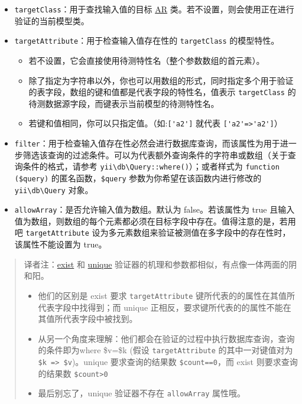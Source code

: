 \begin{itemize}
\item \lstinline|targetClass|：用于查找输入值的目标 \hyperref[db-active-record.md]{AR} 类。若不设置，则会使用正在进行验证的当前模型类。
\item \lstinline|targetAttribute|：用于检查输入值存在性的 \lstinline|targetClass| 的模型特性。\begin{itemize}
\item 若不设置，它会直接使用待测特性名（整个参数数组的首元素）。
\item 除了指定为字符串以外，你也可以用数组的形式，同时指定多个用于验证的表字段，数组的键和值都是代表字段的特性名，值表示 \lstinline|targetClass| 的待测数据源字段，而键表示当前模型的待测特性名。
\item 若键和值相同，你可以只指定值。（如:\lstinline|['a2']| 就代表 \lstinline|['a2'=>'a2']|）
\end{itemize}

\item \lstinline|filter|：用于检查输入值存在性必然会进行数据库查询，而该属性为用于进一步筛选该查询的过滤条件。可以为代表额外查询条件的字符串或数组（关于查询条件的格式，请参考 \texttt{yii{\allowbreak{}\textbackslash}db{\allowbreak{}\textbackslash}Query\allowbreak{}::\allowbreak{}where()}）；或者样式为 \lstinline|function ($query)| 的匿名函数，\lstinline|$query| 参数为你希望在该函数内进行修改的 \texttt{yii{\allowbreak{}\textbackslash}db{\allowbreak{}\textbackslash}Query} 对象。
\item \lstinline|allowArray|：是否允许输入值为数组。默认为 false。若该属性为 true 且输入值为数组，则数组的每个元素都必须在目标字段中存在。值得注意的是，若用吧 \lstinline|targetAttribute| 设为多元素数组来验证被测值在多字段中的存在性时，该属性不能设置为 true。
\end{itemize}
\begin{quote}译者注：\hyperref[tutorial-core-validators.md::::exist]{exist} 和 \hyperref[tutorial-core-validators.md::::unique]{unique} 验证器的机理和参数都相似，有点像一体两面的阴和阳。

\begin{itemize}
\item 他们的区别是 exist 要求 \lstinline|targetAttribute| 键所代表的的属性在其值所代表字段中找得到；而 unique 正相反，要求键所代表的的属性不能在其值所代表字段中被找到。
\item 从另一个角度来理解：他们都会在验证的过程中执行数据库查询，查询的条件即为where \$v=\$k (假设 \lstinline|targetAttribute| 的其中一对键值对为 \lstinline|$k => $v|)。unique 要求查询的结果数 \lstinline|$count==0|，而 exist 则要求查询的结果数 \lstinline|$count>0|
\item 最后别忘了，unique 验证器不存在 \lstinline|allowArray| 属性哦。
\end{itemize}
\end{quote}
